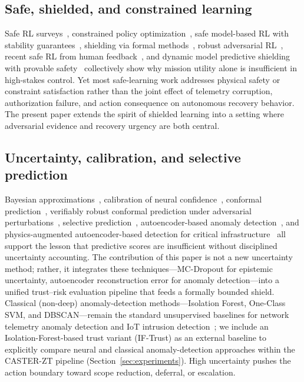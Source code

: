 \documentclass[10pt,journal,compsoc]{IEEEtran}
\begin{document}
\subsection{Safe, shielded, and constrained learning}
Safe RL surveys~\cite{garcia2015saferl,brunke2022safe}, constrained policy optimization~\cite{achiam2017cpo}, safe model-based RL with stability guarantees~\cite{berkenkamp2017safe}, shielding via formal methods~\cite{alshiekh2018shielding}, robust adversarial RL~\cite{pinto2017robust}, recent safe RL from human feedback~\cite{dai2024saferlhf}, and dynamic model predictive shielding with provable safety~\cite{roderick2024dmps} collectively show why mission utility alone is insufficient in high-stakes control.
Yet most safe-learning work addresses physical safety or constraint satisfaction rather than the joint effect of telemetry corruption, authorization failure, and action consequence on autonomous recovery behavior.
The present paper extends the spirit of shielded learning into a setting where adversarial evidence and recovery urgency are both central.

\subsection{Uncertainty, calibration, and selective prediction}
Bayesian approximations~\cite{gal2016dropout}, calibration of neural confidence~\cite{guo2017calibration}, conformal prediction~\cite{angelopoulos2023conformal}, verifiably robust conformal prediction under adversarial perturbations~\cite{lecuyer2024vrcp}, selective prediction~\cite{geifman2017selective}, autoencoder-based anomaly detection~\cite{an2015variational,chalapathy2019deep}, and physics-augmented autoencoder-based detection for critical infrastructure~\cite{azuaje2026physics} all support the lesson that predictive scores are insufficient without disciplined uncertainty accounting.
The contribution of this paper is not a new uncertainty method; rather, it integrates these techniques---MC-Dropout for epistemic uncertainty, autoencoder reconstruction error for anomaly detection---into a unified trust--risk evaluation pipeline that feeds a formally bounded shield.
Classical (non-deep) anomaly-detection methods---Isolation Forest, One-Class SVM, and DBSCAN---remain the standard unsupervised baselines for network telemetry anomaly detection and IoT intrusion detection~\cite{zahoor2025ifocsvm,haque2023dbscanwsn}; we include an Isolation-Forest-based trust variant (IF-Trust) as an external baseline to explicitly compare neural and classical anomaly-detection approaches within the CASTER-ZT pipeline (Section~\ref{sec:experiments}).
High uncertainty pushes the action boundary toward scope reduction, deferral, or escalation.
\end{document}
